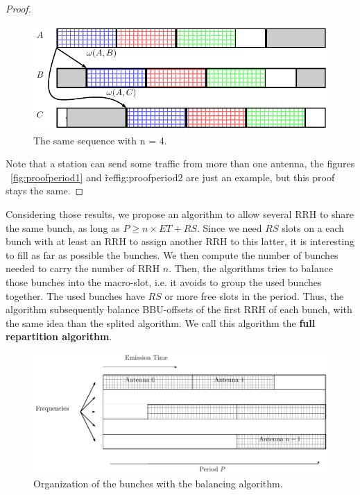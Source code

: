 \documentclass[a4paper,10pt,english]{article}
\begin{document}
\begin{proof}
   \begin{figure}[h]
\centering
      \includegraphics[scale=0.7]{period2.pdf}
     \caption{The same sequence with n = 4.}   \label{fig:proofperiod2}
  \end{figure}
  Note that a station can send some traffic from more than one antenna, the figures ~\ref{fig:proofperiod1} and \~ref{fig:proofperiod2} are just an example, but this proof stays the same.
 \end{proof}
 
Considering those results, we propose an algorithm to allow several RRH to share the same bunch, as long as $P \ge n\times ET + RS$. 
Since we need $RS$ slots on a each bunch with at least an RRH to assign another RRH to this latter, it is interesting to fill as far as possible the bunches. We then compute the number of bunches needed to carry the number of RRH $n$. Then, the algorithms tries to balance those bunches into the macro-slot, i.e. it avoids to group the used bunches together.
The used bunches have $RS$ or more free slots in the period. Thus, the algorithm subsequently balance BBU-offsets of the first RRH of each bunch, with the same idea than the splited algorithm. We call this algorithm the {\bf full repartition algorithm}. 

   \begin{figure}[h]
\centering
      \includegraphics[scale=0.7]{optimalgo.pdf}
     \caption{Organization of the bunches with the balancing algorithm.}   \label{fig:optimalgo}
  \end{figure}
  
\end{document}
